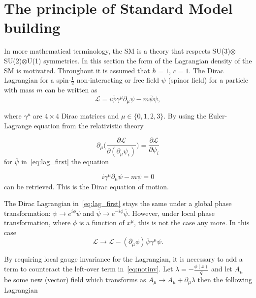 \section{The principle of Standard Model building}
\label{build}
In more mathematical terminology, the \gls{SM} is a theory that respects SU(3)$\otimes$SU(2)$\otimes$U(1) symmetries. In this section the form of the Lagrangian density of the \gls{SM} is motivated. Throughout it is assumed that $\hbar=1$, $c=1$. The Dirac Lagrangian for a spin-$\frac{1}{2}$ non-interacting or free field $\psi$ (spinor field) for a particle with mass $m$ can be written as 
\begin{equation}
\mathcal{L} = i\overline{\psi}\gamma^{\mu}\partial_{\mu}\psi - m\overline{\psi}\psi,
\label{eq:lag_first}
\end{equation}

\noindent where $\gamma^{\mu}$ are $4\times 4$ Dirac matrices and $\mu\in\{0,1,2,3\}$. By using the Euler-Lagrange equation from the relativistic theory

\begin{equation}
	\partial_{\mu}\Big(\frac{\partial{\mathcal{L}}}{\partial(\partial_{\mu}\psi_{i})} \Big) =\frac{\partial \mathcal{L}}{\partial\psi_{i}}
\label{eq:lag_first}
\end{equation}
for $\overline\psi$ in~\autoref{eq:lag_first} the equation 

\begin{equation}
 i\gamma^{\mu}\partial_{\mu}\psi - m\psi = 0
\label{eq:lag_first2}
\end{equation}
can be retrieved. This is the Dirac equation of motion.

The Dirac Lagrangian in~\autoref{eq:lag_first} stays the same under a global phase transformation: $\psi \rightarrow e^{i\phi}\psi$ and $\overline\psi \rightarrow e^{-i\phi}\overline\psi$. However, under local phase transformation, where $\phi$ is a function of $x^{\mu}$, this is not the case any more. In this case
\begin{equation}
\mathcal{L} \rightarrow \mathcal{L}- (\partial_{\mu}\phi) \overline{\psi}\gamma^{\mu}\psi.
\label{eq:notinv}
\end{equation}

By requiring local gauge invariance for the Lagrangian, it is necessary to add a term to counteract the left-over term in~\autoref{eq:notinv}. Let $\lambda=-\frac{\phi(x)}{q}$ and let $A_{\mu}$ be some new (vector) field which transforms as $A_{\mu} \rightarrow A_{\mu} + \partial_{\mu}\lambda$ then the following Lagrangian

